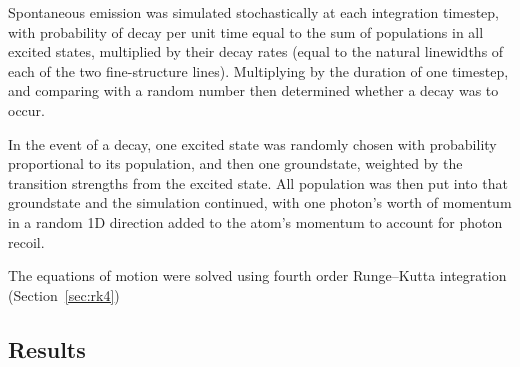 Spontaneous emission was simulated stochastically at each integration timestep, with probability of decay per unit time equal to the sum of populations in all excited states, multiplied by their decay rates (equal to the natural linewidths of each of the two fine-structure lines). Multiplying by the duration of one timestep, and comparing with a random number then determined whether a decay was to occur.

In the event of a decay, one excited state was randomly chosen with probability proportional to its population, and then one groundstate, weighted by the transition strengths from the excited state. All population was then put into that groundstate and the simulation continued, with one photon's worth of momentum in a random 1D direction added to the atom's momentum to account for photon recoil.

The equations of motion were solved using fourth order Runge--Kutta integration (Section~\ref{sec:rk4})

\subsection{Results}

\begin{table}
    \renewcommand{\arraystretch}{2.0}
    \caption{The parameters used in the laser cooling simulations. There are four lasers, each with a specified polarisation, intensity, and detuning from the transition it targets.}\label{table:numbers}
\end{table}

